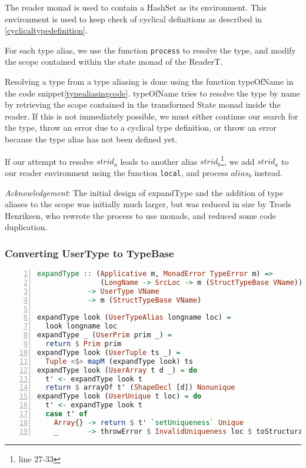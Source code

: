 The reader monad is used to contain a HashSet as its environment. This
environment is used to keep check of cyclical definitions as described in
\ref{cyclicaltypedefinition}.

For each type alias, we use the function \texttt{process} to resolve the type, and modify
the scope contained within the state monad of the ReaderT.

Resolving a type from a type aliasing is done using the function typeOfName in
the code snippet\ref{typealiasingcode}. typeOfName tries to
resolve the type by name by retrieving the scope contained in the transformed
State monad inside the reader. If this is not immediately possible, we must
either continue our search for the type, throw an error due to a cyclical type
definition, or throw an error because the type alias has not been defined yet.

If our attempt to resolve $strid_a$ leads to another alias
$strid_b$\footnote{line 27-33}, we add
$strid_a$ to our reader environment using the function \texttt{local}, and
process $alias_b$ instead.

\textit{Acknowledgement}: The initial design of expandType and the addition of
type aliases to the scope was initially much larger, but was reduced in size by
Troels Henriksen, who rewrote the process to use monads, and reduced some code
duplication. 

\subsubsection{Converting UserType to TypeBase}
\begin{lstlisting}[language=Haskell, numbers=left]
expandType :: (Applicative m, MonadError TypeError m) =>
               (LongName -> SrcLoc -> m (StructTypeBase VName))
            -> UserType VName
            -> m (StructTypeBase VName)

expandType look (UserTypeAlias longname loc) =
  look longname loc
expandType _ (UserPrim prim _) =
  return $ Prim prim
expandType look (UserTuple ts _) =
  Tuple <$> mapM (expandType look) ts
expandType look (UserArray t d _) = do
  t' <- expandType look t
  return $ arrayOf t' (ShapeDecl [d]) Nonunique
expandType look (UserUnique t loc) = do
  t' <- expandType look t
  case t' of
    Array{} -> return $ t' `setUniqueness` Unique
    _       -> throwError $ InvalidUniqueness loc $ toStructural t'

\end{lstlisting}

